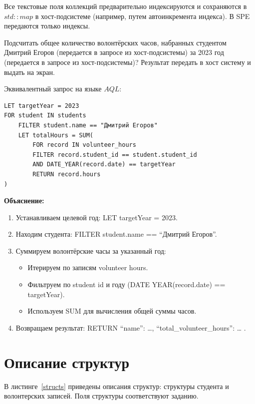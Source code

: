 \documentclass{article}
\begin{document}
Все текстовые поля коллекций предварительно индексируются и сохраняются в $std::map$ в хост-подсистеме (например, путем 
автоинкремента индекса). В SPE передаются только индексы.

Подсчитать общее количество волонтёрских часов, набранных студентом Дмитрий Егоров
(передается в запросе из хост-подсистемы) за 2023 год
(передается в запросе из хост-подсистемы)? Результат передать в хост систему и выдать на экран.

Эквивалентный запрос на языке $AQL$:

\begin{lstlisting}[style=lang, caption=Запрос на языке AQL]
LET targetYear = 2023
FOR student IN students
	FILTER student.name == "Дмитрий Егоров"
	LET totalHours = SUM(
		FOR record IN volunteer_hours
		FILTER record.student_id == student.student_id
		AND DATE_YEAR(record.date) == targetYear
		RETURN record.hours
)
\end{lstlisting}

\textbf{Объяснение:}

\begin{enumerate}
	\item Устанавливаем целевой год: LET targetYear = 2023.
	\item Находим студента: FILTER student.name == “Дмитрий Егоров”.
	\item Суммируем волонтёрские часы за указанный год:
	\begin{itemize}
		\item[---] Итерируем по записям volunteer hours.
		\item[---] Фильтруем по student id и году (DATE YEAR(record.date) == targetYear).
		\item[---] Используем SUM для вычисления общей суммы часов.
	\end{itemize}
	\item Возвращаем результат: RETURN { “name”: …, “total\_volunteer\_hours”: … }.
\end{enumerate}


\clearpage\section{Описание структур}

В листинге~\ref{structs} приведены описания структур: структуры студента и волонтерских записей. Поля структуры соответствуют
заданию. 
\end{document}
